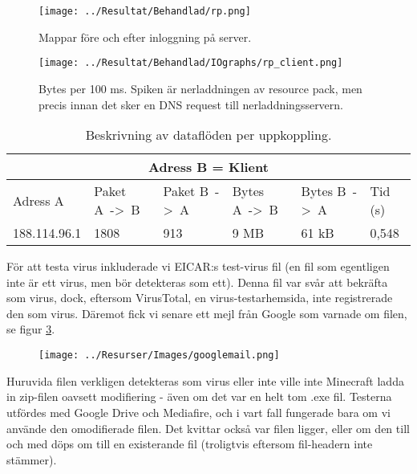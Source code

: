 \documentclass[journal,comsoc]{IEEEtran}
\begin{document}
\begin{figure} [H]
  \centering
  \texttt{[image: ../Resultat/Behandlad/rp.png]}
  \caption{Mappar före och efter inloggning på server.}
  \label{fig:resourcepackfolder}
\end{figure}

\begin{figure} [H]
  \centering
  \texttt{[image: ../Resultat/Behandlad/IOgraphs/rp\_client.png]}
  \caption{Bytes per 100 ms. Spiken är nerladdningen av resource pack, men precis innan det sker en DNS request till nerladdningsservern.}
  \label{fig:client:rp}
\end{figure}
\begin{table} [H]
  \begin{center}
    \label{table:client:rp}
    \begin{tabular}{ | m{1.5cm} |  m{1cm} | m{1cm}| m{1cm}|m{1cm}|m{0.5cm}| } 
      \hline
      \multicolumn{6}{|c|}{Adress B = Klient} \\
      \hline
      Adress A & Paket A~->~B & Paket B~->~A & Bytes A~->~B & Bytes B~->~A & Tid (s) \\
      \hline
      188.114.96.1 & 1808 & 913 & 9 MB & 61 kB & 0,548 \\
      \hline 
    \end{tabular}
  \end{center}
  \caption{Beskrivning av dataflöden per uppkoppling.}
\end{table}

För att testa virus inkluderade vi EICAR:s test-virus fil (en fil som egentligen inte är ett virus, men bör detekteras som ett). \cite{eicar} Denna fil var svår att bekräfta som virus, dock, eftersom VirusTotal, en virus-testarhemsida, inte registrerade den som virus. Däremot fick vi senare ett mejl från Google som varnade om filen, se figur \ref{fig:googlewarn}.

\begin{figure} [H]
  \centering
  \texttt{[image: ../Resurser/Images/googlemail.png]}
  \label{fig:googlewarn}
\end{figure}

Huruvida filen verkligen detekteras som virus eller inte ville inte Minecraft ladda in zip-filen oavsett modifiering - även om det var en helt tom .exe fil. Testerna utfördes med Google Drive och Mediafire, och i vart fall fungerade bara om vi använde den omodifierade filen. Det kvittar också var filen ligger, eller om den till och med döps om till en existerande fil (troligtvis eftersom fil-headern inte stämmer).
\end{document}
